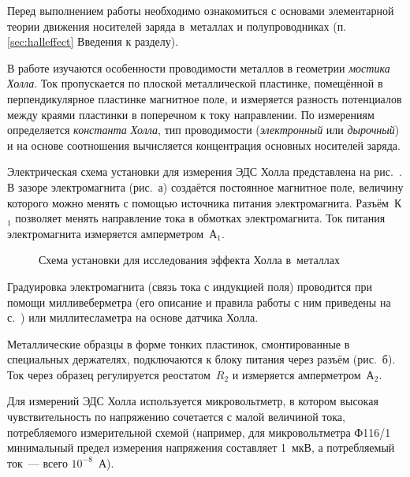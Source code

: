 


Перед выполнением работы необходимо ознакомиться с основами
элементарной теории движения носителей заряда в~металлах и полупроводниках
(п. \ref{sec:halleffect} Введения к разделу).

В работе изучаются особенности проводимости металлов
в геометрии \emph{мостика Холла}.
Ток пропускается по плоской металлической пластинке, 
помещённой в перпендикулярное пластинке магнитное поле,
и измеряется разность потенциалов между краями пластинки в поперечном
к току направлении. По измерениям определяется \emph{константа Холла},
тип проводимости (\emph{электронный} или \emph{дырочный}) и на основе
соотношения  вычисляется концентрация основных
носителей заряда.

\experiment 

Электрическая схема установки для измерения ЭДС Холла представлена
на рис.~.
В зазоре электромагнита (рис.~а) создаётся постоянное магнитное
поле, величину которого можно менять с помощью источника питания электромагнита.
Разъём~К$_1$ позволяет менять направление тока в обмотках электромагнита. Ток
питания электромагнита измеряется амперметром~А$_1$.

\begin{figure}[h!]
    \centering
    \caption{Схема установки для исследования эффекта Холла в~металлах}
\end{figure}

Градуировка электромагнита (связь тока с индукцией поля) проводится 
при помощи милливеберметра (его описание и правила работы 
с ним приведены на с.~\pageref{MWB}) или миллитесламетра на основе
датчика Холла.

Металлические образцы в форме тонких пластинок, смонтированные в специальных
держателях, подключаются к блоку питания через разъём (рис.~б).
Ток через образец регулируется реостатом~$R_2$ и измеряется амперметром~А$_2$.

Для измерений ЭДС Холла используется микровольтметр, в котором
высокая чувствительность по напряжению сочетается с малой величиной тока,
потребляемого измерительной схемой
(например, для микровольтметра Ф116/1 минимальный предел измерения 
напряжения составляет 1~мкВ, а потребляемый ток~--- всего $10^{-8}$~А).

